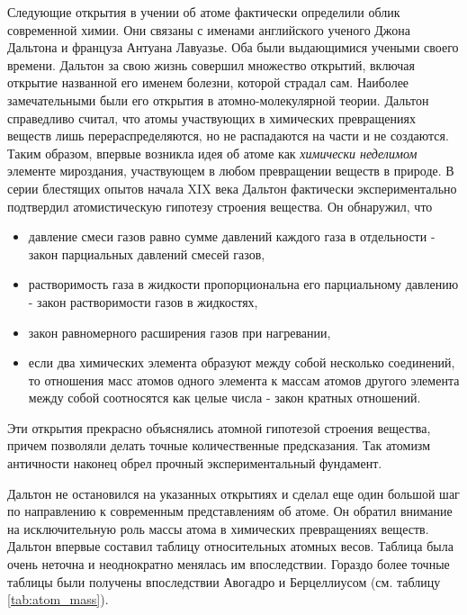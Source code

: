 Следующие открытия в учении об атоме фактически определили облик современной химии.
Они связаны с именами английского ученого Джона Дальтона и француза Антуана Лавуазье.
Оба были выдающимися учеными своего времени.
Дальтон за свою жизнь совершил множество открытий, включая открытие названной его именем болезни, которой страдал сам.
Наиболее замечательными были его открытия в атомно-молекулярной теории.
Дальтон справедливо считал, что атомы участвующих в химических превращениях веществ лишь перераспределяются, но не распадаются на части и не создаются. 
Таким образом, впервые возникла идея об атоме как \textit{химически неделимом} элементе мироздания, участвующем в любом превращении веществ в природе.
В серии блестящих опытов начала XIX века Дальтон фактически экспериментально подтвердил атомистическую гипотезу строения вещества. 
Он обнаружил, что
\begin{itemize}
    \item давление смеси газов равно сумме давлений каждого газа в отдельности - закон парциальных давлений смесей газов,
    \item растворимость газа в жидкости пропорциональна его парциальному давлению - закон растворимости газов в жидкостях,
    \item закон равномерного расширения газов при нагревании,
    \item если два химических элемента образуют между собой несколько соединений, то отношения масс атомов одного элемента к массам атомов другого элемента между собой соотносятся как целые числа - закон кратных отношений.
\end{itemize}
Эти открытия прекрасно объяснялись атомной гипотезой строения вещества, причем позволяли делать точные количественные предсказания.
Так атомизм античности наконец обрел прочный экспериментальный фундамент.

Дальтон не остановился на указанных открытиях и сделал еще один большой шаг по направлению к современным представлениям об атоме.
Он обратил внимание на исключительную роль массы атома в химических превращениях веществ.
Дальтон впервые составил таблицу относительных атомных весов.
Таблица была очень неточна и неоднократно менялась им впоследствии.
Гораздо более точные таблицы были получены впоследствии Авогадро и Берцеллиусом (см. таблицу \ref{tab:atom_mass}).


